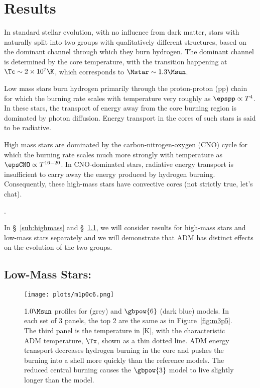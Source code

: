 \section{Results}
\label{sec:results}

In standard stellar evolution, with no influence from dark matter, stars with \mrange naturally split into two groups with qualitatively different structures, based on the dominant channel through which they burn hydrogen. The dominant channel is determined by the core temperature, with the transition happening at $\Tc \sim 2 \times 10^7 \K$, which corresponds to $\Mstar \sim1.3 \Msun$.

Low mass stars burn hydrogen primarily through the proton-proton (pp) chain for which the burning rate scales with temperature very roughly as $\epspp \propto T^4$. In these stars, the transport of energy away from the core burning region is dominated by photon diffusion. Energy transport in the cores of such stars is said to be radiative.

High mass stars are dominated by the carbon-nitrogen-oxygen (CNO) cycle for which the burning rate scales much more strongly with temperature as $\epsCNO \propto T^{16-20}$. In CNO-dominated stars, radiative energy transport is insufficient to carry away the energy produced by hydrogen burning. Consequently, these high-mass stars have convective cores (not strictly true, let's chat).

.

In \S~\ref{sub:highmass} and \S~\ref{sub:lowmass}, we will consider results for high-mass stars and low-mass stars separately and we will demonstrate that ADM has distinct effects on the evolution of the two groups.

\subsection{Low-Mass Stars: \mrangelow}
\label{sub:lowmass}

  \begin{figure}
    \centering
    \texttt{[image: plots/m1p0c6.png]}
    \caption{$1.0 \Msun$ profiles for \nodm (grey) and $\gbpow{6}$ (dark blue) models. In each set of 3 panels, the top 2 are the same as in Figure~\ref{fig:m3p5}. The third panel is the temperature in [K], with the characteristic ADM temperature, $\Tx$, shown as a thin dotted line. ADM energy transport decreases hydrogen burning in the core and pushes the burning into a shell more quickly than the reference models. The reduced central burning causes the $\gbpow{3}$ model to live slightly longer than the \nodm model.
    }
    \label{fig:m1p0_a}
  \end{figure}


